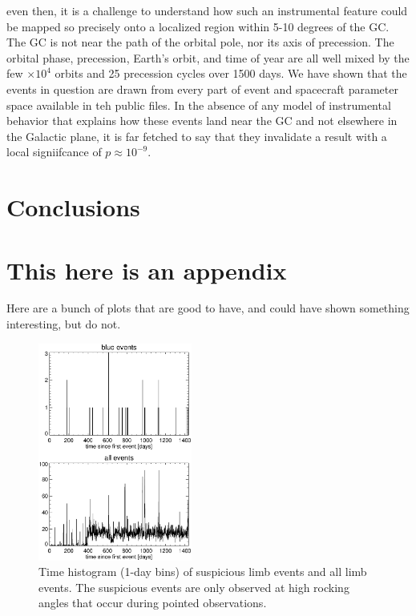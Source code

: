 \documentclass[aps,twocolumn,prd,superscriptaddress,showpacs,nofootinbib,fixfloat]{revtex4}
\begin{document}
even then, it is a challenge to understand how such an instrumental feature
could be mapped so precisely onto a localized region within 5-10 degrees of
the GC.  The GC is not near the path of the orbital pole, nor its axis of
precession.  The orbital phase, precession, Earth's orbit, and time of year
are all well mixed by the few $\times10^4$ orbits and 25 precession cycles
over 1500 days.  We have shown that the events in question are drawn from
every part of event and spacecraft parameter space available in teh public
files.  In the absence of any model of instrumental behavior that explains how
these events land near the GC and not elsewhere in the Galactic plane, it is
far fetched to say that they invalidate a result with a local signiifcance of
$p\approx10^{-9}$.  


\section{Conclusions}

\clearpage
\appendix
\section{This here is an appendix}

Here are a bunch of plots that are good to have, and could have shown
something interesting, but do not. 

\begin{figure}[p]
\centering
\includegraphics[width=0.45\textwidth]{plots/timehist.ps}
\caption{Time histogram (1-day bins) of suspicious limb events and all limb
events.  The suspicious events are only observed at high rocking
angles that occur during pointed observations.
}
\label{fig:timehist}
\end{figure}
\end{document}
